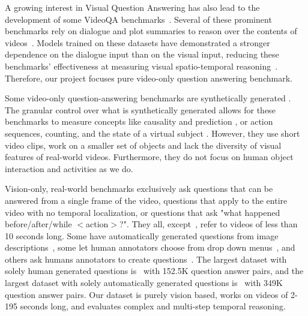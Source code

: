 A growing interest in Visual Question Answering has also lead to the development of some VideoQA benchmarks~\cite{tapaswi2016movieqa,lei2018tvqa,jang2017tgif,kim2017deepstory,xu2017video,maharaj2017dataset,zeng2016leveraging,yu2019activitynet, yi2019clevrer}. Several of these prominent benchmarks rely on dialogue and plot summaries to reason over the contents of videos~\cite{lei2018tvqa,tapaswi2016movieqa,kim2017deepstory, zadeh2019social}. Models trained on these datasets have demonstrated a stronger dependence on the dialogue input than on the visual input, reducing these benchmarks' effectiveness at measuring visual spatio-temporal reasoning~\cite{tapaswi2016movieqa,lei2018tvqa}. Therefore, our project focuses pure video-only question answering benchmark. 

Some video-only question-answering benchmarks are synthetically generated \cite{yi2019clevrer, mun2017marioqa}. The granular control over what is synthetically generated allows for these benchmarks to measure concepts like causality and prediction \cite{yi2019clevrer}, or action sequences, counting, and the state of a virtual subject \cite{mun2017marioqa}. However, they use short video clips, work on a smaller set of objects and lack the diversity of visual features of real-world videos. Furthermore, they do not focus on human object interaction and activities as we do.

Vision-only, real-world benchmarks exclusively ask questions that can be answered from a single frame of the video, questions that apply to the entire video with no temporal localization, or questions that ask "what happened before/after/while $<$action$>$?". They all, except~\cite{yu2019activitynet,xu2017video, zeng2016leveraging}, refer to videos of less than 10 seconds long.  Some have automatically generated questions from image descriptions~\cite{xu2017video,zeng2016leveraging}, some let human annotators choose from drop down menus~\cite{jang2017tgif}, and others ask humans annotators to create questions~\cite{yu2019activitynet,tapaswi2016movieqa,jang2017tgif,lei2018tvqa}. The largest dataset with solely human generated questions is~\cite{lei2018tvqa} with 152.5K question answer pairs, and the largest dataset with solely automatically generated questions is~\cite{maharaj2017dataset} with 349K question answer pairs. Our dataset is purely vision based, works on videos of 2-195 seconds long, and evaluates complex and multi-step temporal reasoning. 


